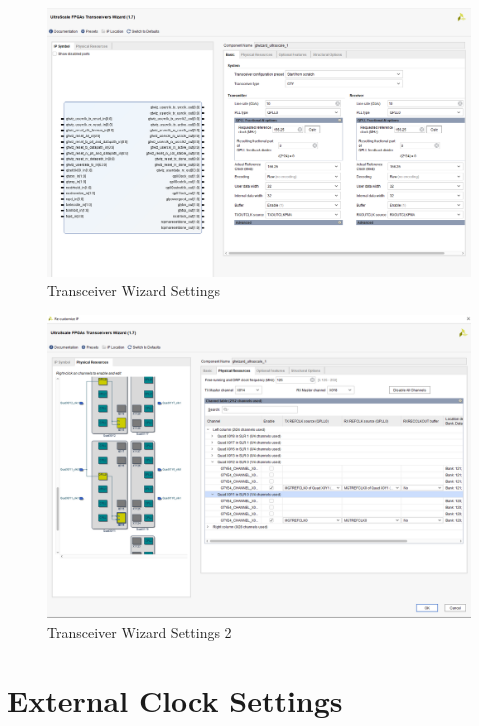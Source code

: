 \documentclass[oneside]{discothesis}
\begin{document}
\begin{figure}[ht]
    \centering
    \hspace*{-2cm}\includegraphics[width=1.3\linewidth]{img/transceiver1.png}
    \caption{Transceiver Wizard Settings}%
    \label{fig:transceiver1}
\end{figure}

\cleardoublepage

\begin{figure}[t]
    \centering
    \hspace*{-2cm}\includegraphics[width=1.3\linewidth]{img/transceiver2.png}
    \caption{Transceiver Wizard Settings 2}%
    \label{fig:transceiver2}
\end{figure}

\cleardoublepage

\section{External Clock Settings}%
\label{sec:external_clock_settings}
\end{document}

